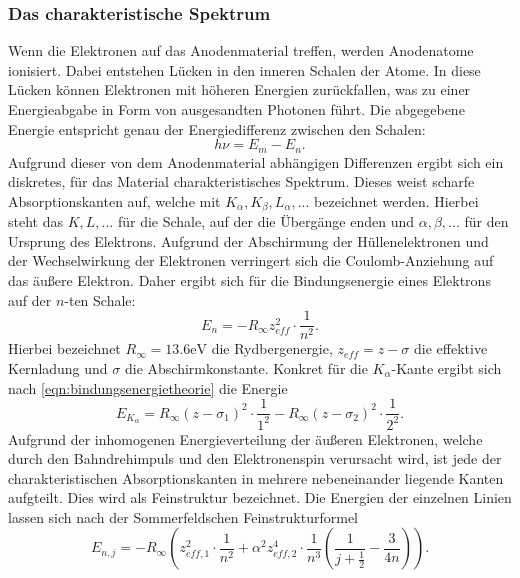 \subsubsection{Das charakteristische Spektrum}
Wenn die Elektronen auf das Anodenmaterial treffen, werden Anodenatome ionisiert.
Dabei entstehen Lücken in den inneren Schalen der Atome. In diese Lücken können
Elektronen mit höheren Energien zurückfallen, was zu einer Energieabgabe in Form
von ausgesandten Photonen führt. Die abgegebene Energie entspricht genau der
Energiedifferenz zwischen den Schalen:
\begin{equation}
  h \nu = E_m - E_n.
  \label{eqn:absorptionskantentheorie}
\end{equation}
Aufgrund dieser von dem Anodenmaterial abhängigen Differenzen ergibt sich ein
diskretes, für das Material charakteristisches Spektrum. Dieses weist scharfe
Absorptionskanten auf, welche mit $K_{\alpha}, K_{\beta}, L_{\alpha}, ...$
bezeichnet werden. Hierbei steht das $K, L, ...$ für die Schale, auf der die
Übergänge enden und $\alpha, \beta, ...$ für den Ursprung des Elektrons.
Aufgrund der Abschirmung der Hüllenelektronen und der Wechselwirkung der
Elektronen verringert sich die Coulomb-Anziehung auf das äußere Elektron.
Daher ergibt sich für die Bindungsenergie eines Elektrons auf der $n$-ten
Schale:
\begin{equation}
  E_n = -R_{\infty} z_{eff}^2 \cdot \frac{1}{n^2}.
  \label{eqn:bindungsenergietheorie}
\end{equation}
Hierbei bezeichnet $R_{\infty} = 13.6 \si{\electronvolt}$ die Rydbergenergie,
$z_{eff} = z - \sigma$ die effektive Kernladung und $\sigma$ die
Abschirmkonstante. Konkret für die $K_{\alpha}$-Kante ergibt sich nach
\eqref{eqn:bindungsenergietheorie} die Energie
\begin{equation}
  E_{K_\alpha} = R_{\infty} (z - \sigma_1)^2 \cdot \frac{1}{1^2} - R_{\infty} (z - \sigma_2)^2 \cdot \frac{1}{2^2}.
  \label{eqn:energiekalphatheorie}
\end{equation}
Aufgrund der inhomogenen Energieverteilung der äußeren Elektronen, welche durch
den Bahndrehimpuls und den Elektronenspin verursacht wird, ist jede der
charakteristischen Absorptionskanten in mehrere nebeneinander liegende Kanten
aufgteilt. Dies wird als Feinstruktur bezeichnet. Die Energien der einzelnen
Linien lassen sich nach der Sommerfeldschen Feinstrukturformel
\begin{equation}
  E_{n,j} = -R_{\infty} \left( z_{eff,1}^2 \cdot \frac{1}{n^2} + \alpha^2 z_{eff,2}^4 \cdot \frac{1}{n^3} \left(  \frac{1}{j + \frac{1}{2}} - \frac{3}{4n} \right) \right).
  \label{eqn:sommerfeldtheorie}
\end{equation}
